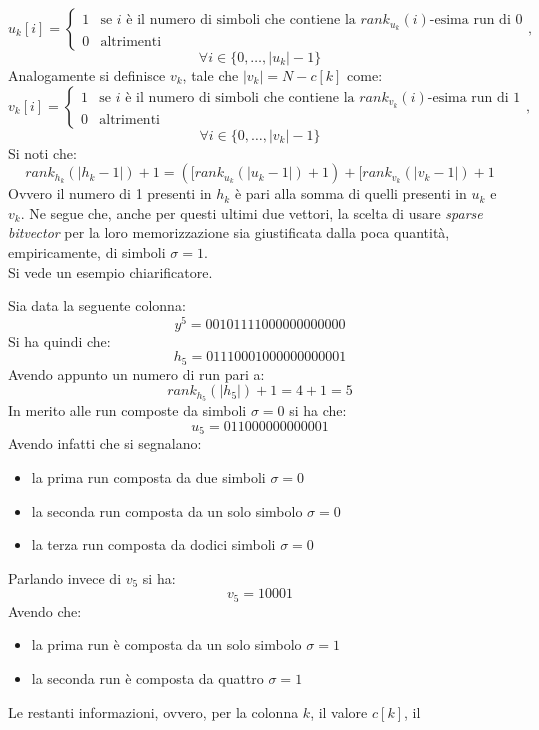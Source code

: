 \[u_k[i]=
  \begin{cases}
    1&\mbox{se }i \mbox{ è il numero di simboli che contiene la
    }rank_{u_k}(i)\mbox{-esima run di 0}\\
    0&\mbox{altrimenti}
  \end{cases},
\]
\vspace{-5mm}
\[\forall i\in\{0,\ldots,|u_k|-1\}\]
Analogamente si definisce $v_k$, tale che $|v_k|=N-c[k]$ come:
\[v_k[i]=
  \begin{cases}
    1&\mbox{se }i \mbox{ è il numero di simboli che contiene la
    }rank_{v_k}(i)\mbox{-esima run di 1}\\
    0&\mbox{altrimenti}
  \end{cases},
\]
\vspace{-5mm}
\[\forall i\in\{0,\ldots,|v_k|-1\}\]
Si noti che:
\[rank_{h_k}(|h_k-1|)+1=([rank_{u_k}(|u_k-1|)+1)+[rank_{v_k}(|v_k-1|)+1\]
Ovvero il numero di 1 presenti in $h_k$ è pari alla somma di quelli presenti in
$u_k$ e $v_k$. Ne segue che, anche per questi ultimi due vettori, la scelta di
usare \textit{sparse bitvector} per la loro memorizzazione sia giustificata
dalla poca quantità, empiricamente, di simboli $\sigma=1$.\\
Si vede un esempio chiarificatore.
\begin{esempio}
  \label{es:bv1}
  Sia data la seguente colonna:
  \[y^5=00101111000000000000\]
  Si ha quindi che:
  \[h_5=01110001000000000001\]
  Avendo appunto un numero di run pari a:
  \[rank_{h_5}(|h_5|)+1=4+1=5\]
  In merito alle run composte da simboli $\sigma=0$ si ha che:
  \[u_5=011000000000001\]
  Avendo infatti che si segnalano:
  \begin{itemize}
    \item la prima run composta da due simboli $\sigma=0$
    \item la seconda run composta da un solo simbolo $\sigma=0$
    \item la terza run composta da dodici simboli $\sigma=0$
  \end{itemize}
  Parlando invece di $v_5$ si ha:
  \[v_5=10001\]
  Avendo che:
  \begin{itemize}
    \item la prima run è composta da un solo simbolo $\sigma=1$
    \item la seconda run è composta da quattro $\sigma=1$
  \end{itemize}
\end{esempio}
Le restanti informazioni, ovvero, per la colonna $k$, il valore $c[k]$, il
